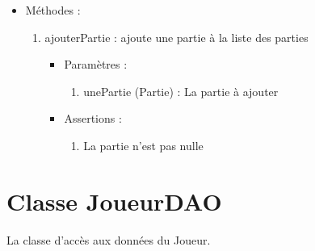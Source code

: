 \begin{itemize}
\begin{enumerate}
  \end{enumerate}

\item Méthodes : 

  \begin{enumerate}
  \item ajouterPartie : ajoute une partie à la liste des parties 
    \begin{itemize}
    \item Paramètres : 
      \begin{enumerate}
      \item unePartie (Partie) : La partie à ajouter
      \end{enumerate}
    \item Assertions : 
      \begin{enumerate}
      \item La partie n'est pas nulle
      \end{enumerate}
    \end{itemize}
  \end{enumerate}
  \end{itemize}

\section {Classe JoueurDAO}

La classe d'accès aux données du Joueur.

